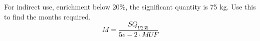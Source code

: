 \documentclass[11pt,answers,addpoints]{exam}
\begin{document}
\begin{questions}
\begin{parts}
\begin{solution}
        For indirect use, enrichment below 20\%, the significant quantity is 75 kg. Use this to find the months required.
        \begin{equation}
            M = \frac{SQ_{U235}}{5e-2 \cdot MUF}
        \end{equation}
        \end{solution}

        \end{parts}


\end{questions}
\end{document}
